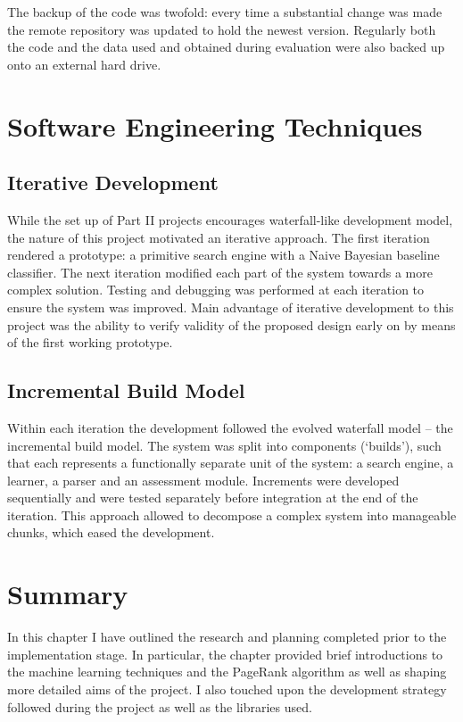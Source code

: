 \documentclass[12pt,notitlepage,twoside]{scrreprt}
\begin{document}
The backup of the code was twofold: every time a substantial change
was made the remote repository was updated to hold the newest version. Regularly both the
code and the data used and obtained during evaluation were also backed up onto an external
hard drive.

\section{Software Engineering Techniques}
\subsection{Iterative Development}
While the set up of Part II projects encourages waterfall-like development model, the
nature of this project motivated an iterative approach. The first iteration rendered a
prototype: a primitive search engine with a Naive Bayesian baseline classifier.  The next
iteration modified each part of the system towards a more complex solution. Testing and
debugging was performed at each iteration to ensure the system was improved. Main
advantage of iterative development to this project was the ability to verify validity of
the proposed design early on by means of the first working prototype.
\subsection{Incremental Build Model}
Within each  iteration the development followed the evolved waterfall model -- the
incremental build model. The system was split into components (`builds'), such that each
represents a functionally separate unit of the system: a search engine, a learner, a
parser and an assessment module. Increments were developed sequentially and were tested
separately before integration at the end of the iteration. This approach allowed to
decompose a complex system into manageable chunks, which eased the development.

\section{Summary}
In this chapter I have outlined the research and planning completed prior to the
implementation stage. In particular, the chapter provided brief introductions to the machine
learning techniques and the PageRank algorithm as well as shaping more detailed aims of
the project. I also touched upon the development strategy followed during the project as
well as the libraries used.
\cleardoublepage
\end{document}
